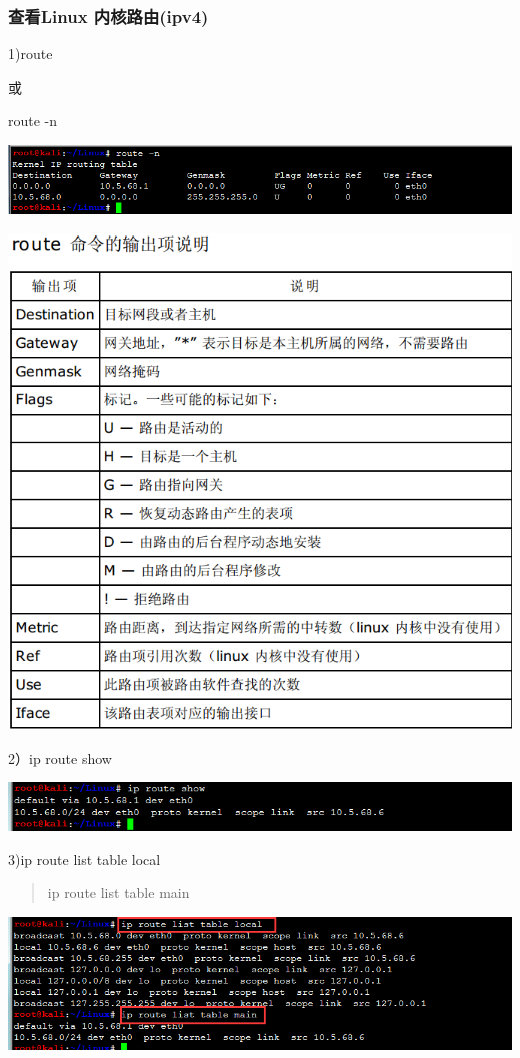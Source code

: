 \documentclass[letterpaper,10pt]{sphinxmanual}
\begin{document}
\subsubsection{查看Linux 内核路由(ipv4)}
\label{Linux_net/route:linux-ipv4}
1)route

或

route -n

\includegraphics{kernel-route.png}

\includegraphics{route.png}

2）ip route show

\includegraphics{route-show.png}

3)ip route list table local
\begin{quote}

ip route list table main
\end{quote}

\includegraphics{table-local.png}
\end{document}

